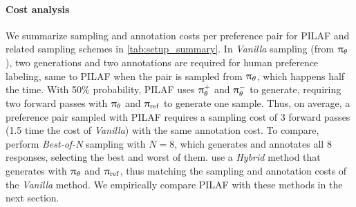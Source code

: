 \paragraph{Cost analysis} We summarize sampling and annotation costs per preference pair for PILAF and related sampling schemes in \cref{tab:setup_summary}. In \textit{Vanilla} sampling (from $\uppi_{\theta}$), two generations and two annotations are required for human preference labeling, same to PILAF when the pair is sampled from $\uppi_{\theta}$, which happens half the time. With 50\% probability, PILAF uses $\uppi_{\theta}^+$ and $\uppi_{\theta}^-$ to generate, requiring two forward passes with $\uppi_{\theta}$ and $\uppi_{{\rm ref}}$ to generate one sample. Thus, on average, a preference pair sampled with PILAF requires a sampling cost of 3 forward passes (1.5 time the cost of \textit{Vanilla}) with the same annotation cost. To compare, \citet{xiong2024iterative, dong2024rlhf} perform \textit{Best-of-N} sampling with $N=8$, which generates and annotates all 8 responses, selecting the best and worst of them. \citet{xie2024exploratory} use a \textit{Hybrid} method that generates with $\uppi_{\theta}$ and $\uppi_{{\rm ref}}$, thus matching the sampling and annotation costs of the \textit{Vanilla} method. We empirically compare PILAF with these methods in the next section.


    
		

